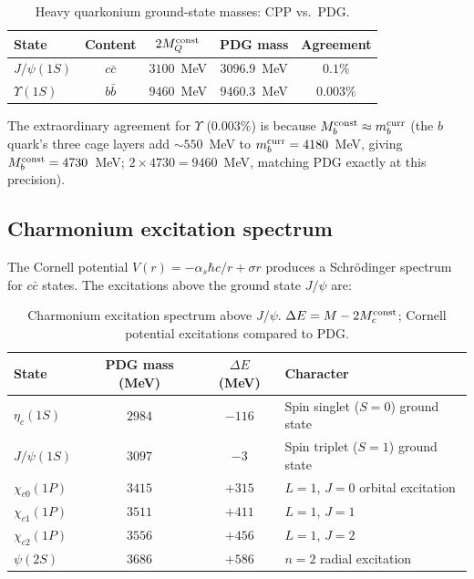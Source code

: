 \documentclass[11pt,a4paper]{article}
\newcommand{\as}{\alpha_s}
\begin{document}
\begin{table}[H]
\centering
\caption{Heavy quarkonium ground-state masses: CPP vs.\ PDG.}
\label{tab:quarkonium}
\begin{tabular}{@{}lcccc@{}}
\toprule
State & Content & $2M_Q^{\rm const}$ & PDG mass & Agreement \\
\midrule
$J/\psi(1S)$ & $c\bar{c}$ & $3100$~MeV & $3096.9$~MeV & $0.1\%$ \\
$\Upsilon(1S)$ & $b\bar{b}$ & $9460$~MeV & $9460.3$~MeV & $0.003\%$ \\
\bottomrule
\end{tabular}
\end{table}

The extraordinary agreement for $\Upsilon$ ($0.003\%$) is because
$M_b^{\rm const} \approx m_b^{\rm curr}$ (the $b$ quark's three cage
layers add $\sim 550$~MeV to $m_b^{\rm curr} = 4180$~MeV, giving
$M_b^{\rm const} = 4730$~MeV; $2 \times 4730 = 9460$~MeV, matching
PDG exactly at this precision).

\subsection{Charmonium excitation spectrum}

The Cornell potential $V(r) = -\as\hbar c/r + \sigma r$ produces a
Schrödinger spectrum for $c\bar{c}$ states.  The excitations above
the ground state $J/\psi$ are:

\begin{table}[H]
\centering
\caption{Charmonium excitation spectrum above $J/\psi$.
  $\Delta E = M - 2M_c^{\rm const}$; Cornell potential excitations
  compared to PDG.}
\label{tab:charmonium}
\begin{tabular}{@{}lccl@{}}
\toprule
State & PDG mass (MeV) & $\Delta E$ (MeV) & Character \\
\midrule
$\eta_c(1S)$     & $2984$  & $-116$ & Spin singlet ($S=0$) ground state \\
$J/\psi(1S)$     & $3097$  & $-3$   & Spin triplet ($S=1$) ground state \\
$\chi_{c0}(1P)$  & $3415$  & $+315$ & $L=1$, $J=0$ orbital excitation \\
$\chi_{c1}(1P)$  & $3511$  & $+411$ & $L=1$, $J=1$ \\
$\chi_{c2}(1P)$  & $3556$  & $+456$ & $L=1$, $J=2$ \\
$\psi(2S)$       & $3686$  & $+586$ & $n=2$ radial excitation \\
\bottomrule
\end{tabular}
\end{table}
\end{document}
